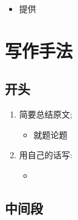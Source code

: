     \begin{itemize}
      \item 提供
    \end{itemize}

\section{写作手法}

  \subsection{开头}

    \begin{enumerate}
      \item 简要总结原文;
      \begin{itemize}
        \item 就题论题
      \end{itemize}

      \item 用自己的话写: 
      \begin{itemize}
        \item {}
      \end{itemize}
    \end{enumerate}

  \subsection{中间段}

